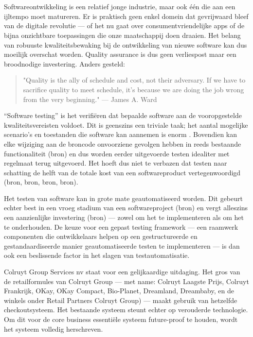 
\chapter{}
\label{ch:inleiding}

Softwareontwikkeling is een relatief jonge industrie, maar ook één die aan een ijltempo moet matureren. Er is praktisch geen enkel domein dat gevrijwaard bleef van de digitale revolutie — of het nu gaat over consumentvriendelijke apps of de bijna onzichtbare toepassingen die onze maatschappij doen draaien. Het belang van robuuste kwaliteitsbewaking bij de ontwikkeling van nieuwe software kan dus moeilijk overschat worden. Quality assurance is dus geen verliespost maar een broodnodige investering. Anders gesteld:

\begin{quote}
"Quality is the ally of schedule and cost, not their adversary. If we have to sacrifice quality to meet schedule, it's because we are doing the job wrong from the very beginning." — James A. Ward
\end{quote}

“Software testing” is het verifiëren dat bepaalde software aan de vooropgestelde kwaliteitsvereisten voldoet. Dit is geenszins een triviale taak; het aantal mogelijke scenario’s en toestanden die software kan aannemen is enorm \autocite{Stamelos2007}. Bovendien kan elke wijziging aan de broncode onvoorziene gevolgen hebben in reeds bestaande functionaliteit (bron) en dus worden eerder uitgevoerde testen idealiter met regelmaat terug uitgevoerd. Het hoeft dus niet te verbazen dat testen naar schatting de helft van de totale kost van een softwareproduct vertegenwoordigd (bron, bron, bron, bron).

Het testen van software kan in grote mate geautomatiseerd worden. Dit gebeurt echter best in een vroeg stadium van een softwareproject (bron) en vergt alleszins een aanzienlijke investering (bron) — zowel om het te implementeren als om het te onderhouden. De keuze voor een gepast testing framework — een raamwerk componenten die ontwikkelaars helpen op een gestructureerde en gestandaardiseerde manier geautomatiseerde testen te implementeren — is dan ook een beslissende factor in het slagen van testautomatisatie.

Colruyt Group Services nv staat voor een gelijkaardige uitdaging. Het gros van de retailformules van Colruyt Group — met name: Colruyt Laagste Prijs, Colruyt Frankrijk, OKay, OKay Compact, Bio-Planet, Dreamland, Dreambaby, en de winkels onder Retail Partners Colruyt Group) — maakt gebruik van hetzelfde checkoutsysteem. Het bestaande systeem steunt echter op verouderde technologie. Om dit voor de core business essentiële systeem future-proof te houden, wordt het systeem volledig herschreven.

